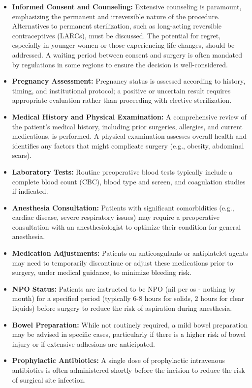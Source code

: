 \begin{itemize}
  \item \textbf{Informed Consent and Counseling:} Extensive counseling is paramount, emphasizing the permanent and irreversible nature of the procedure. Alternatives to permanent sterilization, such as long-acting reversible contraceptives (LARCs), must be discussed. The potential for regret, especially in younger women or those experiencing life changes, should be addressed. A waiting period between consent and surgery is often mandated by regulations in some regions to ensure the decision is well-considered.

  \item \textbf{Pregnancy Assessment:} Pregnancy status is assessed according to history, timing, and institutional protocol; a positive or uncertain result requires appropriate evaluation rather than proceeding with elective sterilization.

  \item \textbf{Medical History and Physical Examination:} A comprehensive review of the patient's medical history, including prior surgeries, allergies, and current medications, is performed. A physical examination assesses overall health and identifies any factors that might complicate surgery (e.g., obesity, abdominal scars).

  \item \textbf{Laboratory Tests:} Routine preoperative blood tests typically include a complete blood count (CBC), blood type and screen, and coagulation studies if indicated.

  \item \textbf{Anesthesia Consultation:} Patients with significant comorbidities (e.g., cardiac disease, severe respiratory issues) may require a preoperative consultation with an anesthesiologist to optimize their condition for general anesthesia.

  \item \textbf{Medication Adjustments:} Patients on anticoagulants or antiplatelet agents may need to temporarily discontinue or adjust these medications prior to surgery, under medical guidance, to minimize bleeding risk.

  \item \textbf{NPO Status:} Patients are instructed to be NPO (nil per os - nothing by mouth) for a specified period (typically 6-8 hours for solids, 2 hours for clear liquids) before surgery to reduce the risk of aspiration during anesthesia.

  \item \textbf{Bowel Preparation:} While not routinely required, a mild bowel preparation may be advised in specific cases, particularly if there is a higher risk of bowel injury or if extensive adhesions are anticipated.

  \item \textbf{Prophylactic Antibiotics:} A single dose of prophylactic intravenous antibiotics is often administered shortly before the incision to reduce the risk of surgical site infection.
\end{itemize}


